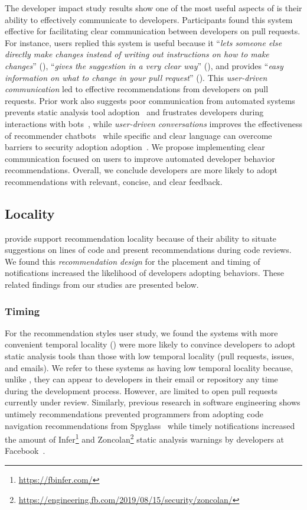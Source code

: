 The developer impact study results show one of the most useful aspects of \sugg is their ability to effectively communicate to developers. Participants found this system effective for facilitating clear communication between developers on pull requests. For instance, users replied this system is useful because it ``\textit{lets someone else directly make changes instead of writing out instructions on how to make changes}'' (), ``\textit{gives the suggestion in a very clear way}'' (), and provides ``\textit{easy information on what to change in your pull request}'' (). This \textit{user-driven communication} led to effective recommendations from developers on pull requests. Prior work also suggests poor communication from automated systems prevents static analysis tool adoption~\cite{Johnson2013Why} and frustrates developers during interactions with bots~\cite{wessel2018power}, while \textit{user-driven conversations} improves the effectiveness of recommender chatbots~\cite{cerezo2019building} while specific and clear language can overcome barriers to security adoption adoption~\cite{Xiao2014Security}. We propose implementing clear communication focused on users to improve automated developer behavior recommendations. Overall, we conclude developers are more likely to adopt recommendations with relevant, concise, and clear feedback.


\subsection{Locality}

\suggs provide support recommendation locality because of their ability to situate suggestions on lines of code and present recommendations during code reviews. We found this \textit{recommendation design} for the placement and timing of notifications increased the likelihood of developers adopting behaviors. These related findings from our studies are presented below.

\subsubsection{Timing} For the recommendation styles user study, we found the systems with more convenient temporal locality (\suggs) were more likely to convince developers to adopt static analysis tools than those with low temporal locality (pull requests, issues, and emails). We refer to these systems as having low temporal locality because, unlike \sugg, they can appear to developers in their email or repository any time during the development process. However, \sugg are limited to open pull requests currently under review. Similarly, previous research in software engineering shows untimely recommendations prevented programmers from adopting code navigation recommendations from Spyglass~\cite{viriyakattiyaporn2009challenges} while timely notifications increased the amount of Infer\footnote{\url{https://fbinfer.com/}} and Zoncolan\footnote{\url{https://engineering.fb.com/2019/08/15/security/zoncolan/}} static analysis warnings by developers at Facebook~\cite{Distefano2019Facebook}.

